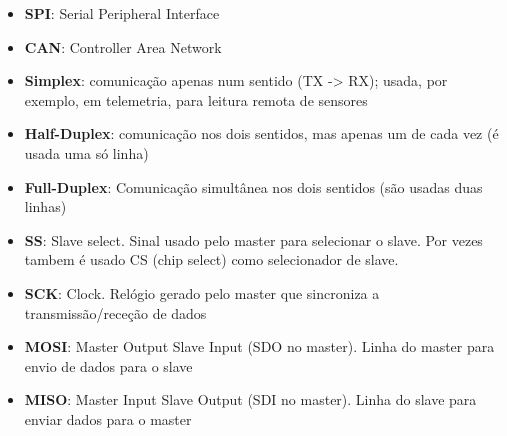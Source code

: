 \documentclass[a4paper, 12pt, onecolumn, oneside]{scrartcl}
\begin{document}
\begin{itemize}
    \item\label{spi} \textbf{SPI}: Serial Peripheral Interface
    \item\label{can} \textbf{CAN}: Controller Area Network
    \item\label{simplex} \textbf{Simplex}: comunicação apenas num sentido (TX -> RX); usada, por
    exemplo, em telemetria, para leitura remota de sensores
    \item\label{halfduplex} \textbf{Half-Duplex}: comunicação nos dois sentidos, mas apenas um de
    cada vez (é usada uma só linha)
    \item\label{fullduplex} \textbf{Full-Duplex}: Comunicação simultânea nos dois sentidos (são
    usadas duas linhas)
    \item\label{ss} \textbf{SS}: Slave select. Sinal usado pelo master para selecionar o slave. Por vezes
    tambem é usado CS (chip select) como selecionador de slave.
    \item\label{sck} \textbf{SCK}: Clock. Relógio gerado pelo master que sincroniza a transmissão/receção de dados
    \item\label{mosi} \textbf{MOSI}: Master Output Slave Input (SDO no master).
    Linha do master para envio de dados para o slave
    \item\label{miso} \textbf{MISO}: Master Input Slave Output (SDI no master).
    Linha do slave para enviar dados para o master
\end{itemize}
\end{document}
